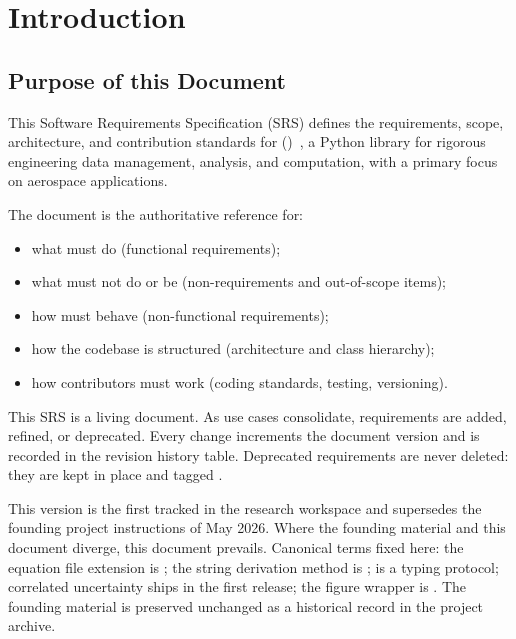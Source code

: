 
\chapter{Introduction}
\label{ch:introduction}

\section{Purpose of this Document}

This Software Requirements Specification (SRS) defines the requirements,
scope, architecture, and contribution standards for \itc{}
()~\citep{python}, a Python library for rigorous
engineering data management, analysis, and computation, with a primary focus
on aerospace applications.

The document is the authoritative reference for:
\begin{itemize}[noitemsep,topsep=2pt]
  \item what \itc{} must do (functional requirements);
  \item what \itc{} must not do or be (non-requirements and out-of-scope items);
  \item how \itc{} must behave (non-functional requirements);
  \item how the codebase is structured (architecture and class hierarchy);
  \item how contributors must work (coding standards, testing, versioning).
\end{itemize}

\begin{noteinfo}
This SRS is a living document. As use cases consolidate, requirements are
added, refined, or deprecated. Every change increments the document version
and is recorded in the revision history table. Deprecated requirements are
never deleted: they are kept in place and tagged \deprecated{}.
\end{noteinfo}

\begin{noteinfo}
This version is the first tracked in the research workspace and supersedes
the founding project instructions of May 2026. Where the founding material
and this document diverge, this document prevails. Canonical terms fixed
here: the equation file extension is ; the string derivation
method is ;  is a typing protocol;
correlated uncertainty ships in the first release; the figure wrapper is
. The founding material is preserved unchanged as a
historical record in the project archive.
\end{noteinfo}

